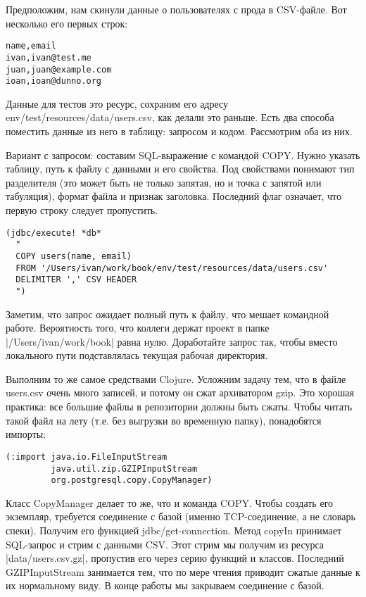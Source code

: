 Предположим, нам скинули данные о пользователях с прода в CSV-файле. Вот
несколько его первых строк:

\begin{verbatim}
name,email
ivan,ivan@test.me
juan,juan@example.com
ioan,ioan@dunno.org
\end{verbatim}

Данные для тестов это ресурс, сохраним его адресу
env/test/resources/data/users.csv, как делали это раньше. Есть два способа
поместить данные из него в таблицу: запросом и кодом. Рассмотрим оба из них.

Вариант с запросом: составим SQL-выражение с командой COPY. Нужно указать
таблицу, путь к файлу с данными и его свойства. Под свойствами понимают тип
разделителя (это может быть не только запятая, но и точка с запятой или
табуляция), формат файла и признак заголовка. Последний флаг означает, что
первую строку следует пропустить.

\begin{verbatim}
(jdbc/execute! *db*
  "
  COPY users(name, email)
  FROM '/Users/ivan/work/book/env/test/resources/data/users.csv'
  DELIMITER ',' CSV HEADER
  ")
\end{verbatim}

Заметим, что запрос ожидает полный путь к файлу, что мешает командной
работе. Вероятность того, что коллеги держат проект в папке
\spverb|/Users/ivan/work/book| равна нулю. Доработайте запрос так, чтобы вместо
локального пути подставлялась текущая рабочая директория.

Выполним то же самое средствами Clojure. Усложним задачу тем, что в файле
users.csv очень много записей, и потому он сжат архиватором gzip. Это хорошая
практика: все большие файлы в репозитории должны быть сжаты. Чтобы читать такой
файл на лету (т.е. без выгрузки во временную папку), понадобятся импорты:

\begin{verbatim}
(:import java.io.FileInputStream
         java.util.zip.GZIPInputStream
         org.postgresql.copy.CopyManager)
\end{verbatim}

Класс CopyManager делает то же, что и команда COPY. Чтобы создать его экземпляр,
требуется соединение с базой (именно TCP-соединение, а не словарь
спеки). Получим его функцией jdbc/get-connection. Метод copyIn принимает
SQL-запрос и стрим с данными CSV. Этот стрим мы получим из ресурса
\spverb|data/users.csv.gz|, пропустив его через серию функций и классов. Последний
GZIPInputStream занимается тем, что по мере чтения приводит сжатые данные к их
нормальному виду. В конце работы мы закрываем соединение с базой.

